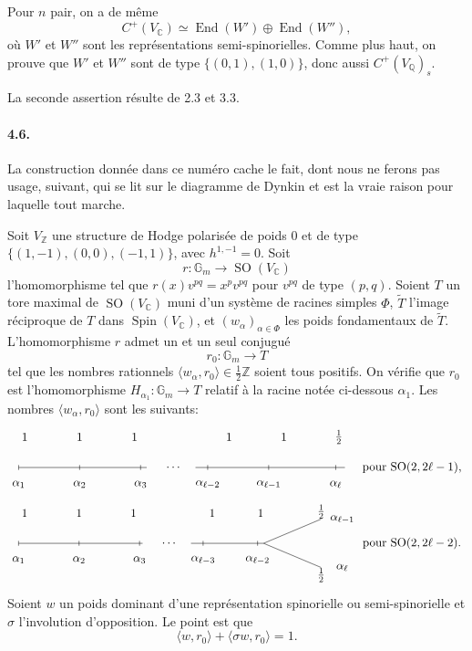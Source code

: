 \documentclass[10pt]{article}
\newcommand{\C}{\mathbb{C}}
\newcommand{\Q}{\mathbb{Q}}
\newcommand{\Z}{\mathbb{Z}}
\newcommand{\Gm}{\mathbb{G}_m}
\newcommand{\End}{\operatorname{End}}
\newcommand{\SO}{\operatorname{SO}}
\newcommand{\Spin}{\operatorname{Spin}}
\begin{document}
Pour $n$ pair, on a de même
\[
C^+(V_\C)\simeq\End(W')\oplus\End(W''),
\]
où $W'$ et $W''$ sont les représentations semi-spinorielles. Comme plus haut, on prouve que $W'$ et $W''$ sont de type $\{(0,1),(1,0)\}$, donc aussi $C^+(V_\Q)_s$.

La seconde assertion résulte de 2.3 et 3.3.

\paragraph{4.6.} La construction donnée dans ce numéro cache le fait, dont nous ne ferons pas usage, suivant, qui se lit sur le diagramme de Dynkin et est la vraie raison pour laquelle tout marche.

Soit $V_\Z$ une structure de Hodge polarisée de poids $0$ et de type $\{(1,-1),(0,0),(-1,1)\}$, avec $h^{1,-1}=0$. Soit
\[
r:\Gm\longrightarrow\SO(V_\C)
\]
l'homomorphisme tel que $r(x)v^{pq}=x^p v^{pq}$ pour $v^{pq}$ de type $(p,q)$. Soient $T$ un tore maximal de $\SO(V_\C)$ muni d'un système de racines simples $\Phi$, $\widetilde T$ l'image réciproque de $T$ dans $\Spin(V_\C)$, et $(w_\alpha)_{\alpha\in\Phi}$ les poids fondamentaux de $\widetilde T$. L'homomorphisme $r$ admet un et un seul conjugué
\[
r_0:\Gm\longrightarrow T
\]
tel que les nombres rationnels $\langle w_\alpha,r_0\rangle\in\frac12\Z$ soient tous positifs. On vérifie que $r_0$ est l'homomorphisme $H_{\alpha_1}:\Gm\to T$ relatif à la racine notée ci-dessous $\alpha_1$. Les nombres $\langle w_\alpha,r_0\rangle$ sont les suivants:
\[
\begin{tikzpicture}[baseline={(current bounding box.center)},scale=0.9]
\node at (-0.8,1.0) {$1$};\node at (1.0,1.0) {$1$};\node at (2.8,1.0) {$1$};
\node at (5.9,1.0) {$1$};\node at (7.7,1.0) {$1$};\node at (9.5,1.0) {$\frac12$};
\draw (-1,0)--(3.2,0); \draw (4.8,0)--(9.7,0);
\foreach \x/\a in {-1/\alpha_1,1/\alpha_2,3/\alpha_3,5.2/\alpha_{\ell-2},7.2/\alpha_{\ell-1},9.4/\alpha_\ell}
{\draw (\x,0.08)--(\x,-0.08); \node at (\x,-0.55) {$\a$};}
\node at (4.1,0) {$\cdots$};
\node at (11.9,0) {pour $\SO(2,2\ell-1)$,};
\end{tikzpicture}
\]
\[
\begin{tikzpicture}[baseline={(current bounding box.center)},scale=0.9]
\node at (-0.8,1.0) {$1$};\node at (1.0,1.0) {$1$};\node at (2.8,1.0) {$1$};
\node at (5.4,1.0) {$1$};\node at (7.0,1.0) {$1$};\node at (9.0,1.05) {$\frac12$};\node at (9.0,-1.05) {$\frac12$};
\draw (-1,0)--(3.1,0); \draw (4.7,0)--(7.1,0);
\draw (7.1,0)--(9.0,0.8); \draw (7.1,0)--(9.0,-0.8);
\foreach \x/\a in {-1/\alpha_1,1/\alpha_2,3/\alpha_3,5.1/\alpha_{\ell-3},6.9/\alpha_{\ell-2}}
{\draw (\x,0.08)--(\x,-0.08); \node at (\x,-0.55) {$\a$};}
\node at (4.0,0) {$\cdots$};
\node at (9.7,0.8) {$\alpha_{\ell-1}$};
\node at (9.7,-0.8) {$\alpha_\ell$};
\node at (12.0,0) {pour $\SO(2,2\ell-2)$.};
\end{tikzpicture}
\]
Soient $w$ un poids dominant d'une représentation spinorielle ou semi-spinorielle et $\sigma$ l'involution d'opposition. Le point est que
\[
\langle w,r_0\rangle+\langle\sigma w,r_0\rangle=1.
\]
\end{document}
